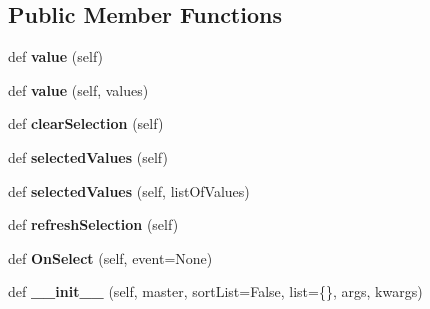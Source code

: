 \subsection*{Public Member Functions}
\begin{DoxyCompactItemize}
\item 
\mbox{\label{class_c_utils_1_1_utils_1_1_u_i_1_1_controls_1_1_lst_box_a50195cb9bdd51876945eb2dd6fac4cac}} 
def {\bfseries value} (self)
\item 
\mbox{\label{class_c_utils_1_1_utils_1_1_u_i_1_1_controls_1_1_lst_box_a75bf740677ae53ef99707fdc9ede9f5b}} 
def {\bfseries value} (self, values)
\item 
\mbox{\label{class_c_utils_1_1_utils_1_1_u_i_1_1_controls_1_1_lst_box_a9bb637c47bf87426deb6e0821e31c15f}} 
def {\bfseries clear\+Selection} (self)
\item 
\mbox{\label{class_c_utils_1_1_utils_1_1_u_i_1_1_controls_1_1_lst_box_a6726595c6381657ea6d43634eb6f1acb}} 
def {\bfseries selected\+Values} (self)
\item 
\mbox{\label{class_c_utils_1_1_utils_1_1_u_i_1_1_controls_1_1_lst_box_a0655f728fca2412c729fcae92722075e}} 
def {\bfseries selected\+Values} (self, list\+Of\+Values)
\item 
\mbox{\label{class_c_utils_1_1_utils_1_1_u_i_1_1_controls_1_1_lst_box_afea4102108f673b1bc00df55095c7068}} 
def {\bfseries refresh\+Selection} (self)
\item 
\mbox{\label{class_c_utils_1_1_utils_1_1_u_i_1_1_controls_1_1_lst_box_a1d458e4e6adb2f8a9a0af8bc280af7c8}} 
def {\bfseries On\+Select} (self, event=None)
\item 
\mbox{\label{class_c_utils_1_1_utils_1_1_u_i_1_1_controls_1_1_lst_box_a0c5bac0610bebbd9b115f85e9a9fba36}} 
def {\bfseries \+\_\+\+\_\+init\+\_\+\+\_\+} (self, master, sort\+List=False, list=\{\}, args, kwargs)
\end{DoxyCompactItemize}
